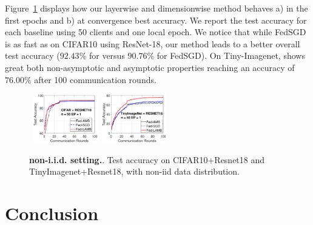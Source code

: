 \documentclass[twoside]{article}
\begin{document}
Figure~\ref{fig:noniidresnet18} displays how our layerwise and dimensionwise method behaves a) in the first epochs and b) at convergence best accuracy. We report the test accuracy for each baseline using 50 clients and one local epoch. We notice that while FedSGD is as fast as \algo on CIFAR10 using ResNet-18, our method leads to a better overall test accuracy ($92.43\%$ for \algo versus $90.76\%$ for FedSGD).
On Tiny-Imagenet, \algo shows great both non-asymptotic and asymptotic properties reaching an accuracy of $76.00\%$ after 100 communication rounds.


\begin{figure}[t!]
    \begin{center}
        \mbox{
        \includegraphics[width=0.25\textwidth]{new_figure/cifar_testerror_resnet18_ep1_client2_iid0.eps}
        \includegraphics[width=0.25\textwidth]{new_figure/tinyimagenet_testerror_resnet18_ep1_client2_iid0.eps}
        }
            \end{center}
	\caption{\textbf{non-i.i.d. setting.}. Test accuracy on CIFAR10+Resnet18 and TinyImagenet+Resnet18, with non-iid data distribution.
	}
	\label{fig:noniidresnet18}
\end{figure}





\section{Conclusion}\label{sec:conclusion}
\end{document}
